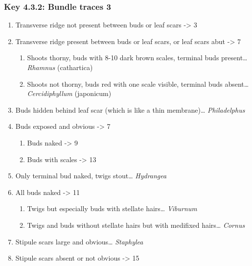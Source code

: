 \documentclass[openany]{book}
\providecommand{\tightlist}{%
  \setlength{\itemsep}{0pt}\setlength{\parskip}{0pt}}
\begin{document}
\hypertarget{key-4.3.2-bundle-traces-3-1}{%
\subsubsection{Key 4.3.2: Bundle traces
3}\label{key-4.3.2-bundle-traces-3-1}}

\begin{enumerate}
\def\labelenumi{\arabic{enumi}.}
\tightlist
\item
  Transverse ridge not present between buds or leaf scars
  -\textgreater{} 3
\item
  Transverse ridge present between buds or leaf scars, or leaf scars
  abut -\textgreater{} 7

  \begin{enumerate}
  \def\labelenumii{\arabic{enumii}.}
  \setcounter{enumii}{2}
  \tightlist
  \item
    Shoots thorny, buds with 8-10 dark brown scales, terminal buds
    present\ldots{} \emph{Rhamnus} (cathartica)
  \item
    Shoots not thorny, buds red with one scale visible, terminal buds
    absent\ldots{} \emph{Cercidiphyllum} (japonicum)
  \end{enumerate}
\item
  Buds hidden behind leaf scar (which is like a thin membrane)\ldots{}
  \emph{Philadelphus}
\item
  Buds exposed and obvious -\textgreater{} 7

  \begin{enumerate}
  \def\labelenumii{\arabic{enumii}.}
  \setcounter{enumii}{6}
  \tightlist
  \item
    Buds naked -\textgreater{} 9
  \item
    Buds with scales -\textgreater{} 13
  \end{enumerate}
\item
  Only terminal bud naked, twigs stout\ldots{} \emph{Hydrangea}
\item
  All buds naked -\textgreater{} 11

  \begin{enumerate}
  \def\labelenumii{\arabic{enumii}.}
  \setcounter{enumii}{10}
  \tightlist
  \item
    Twigs but especially buds with stellate hairs\ldots{}
    \emph{Viburnum}
  \item
    Twigs and buds without stellate hairs but with medifixed
    hairs\ldots{} \emph{Cornus}
  \end{enumerate}
\item
  Stipule scars large and obvious\ldots{} \emph{Staphylea}
\item
  Stipule scars absent or not obvious -\textgreater{} 15


\end{enumerate}
\end{document}
